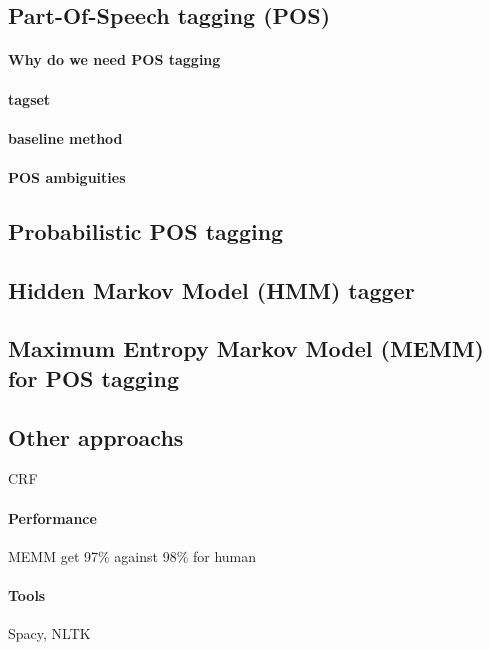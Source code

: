 			\subsection{Part-Of-Speech tagging (POS)}

				\paragraph*{Why do we need POS tagging}

				\paragraph*{tagset}

				\paragraph*{baseline method}


				\paragraph*{POS ambiguities}
			\subsection{Probabilistic POS tagging}

			\subsection{Hidden Markov Model (HMM) tagger}

			\subsection{Maximum Entropy Markov Model (MEMM) for POS tagging}

			\subsection{Other approachs}
				CRF

			\paragraph*{Performance}
				MEMM get 97\% against 98\% for human

			\paragraph*{Tools}
				Spacy, NLTK

